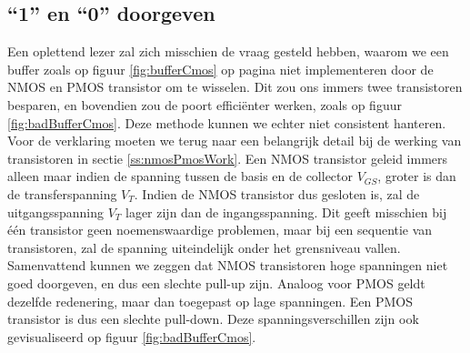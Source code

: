 \subsection{``1'' en ``0'' doorgeven}
Een oplettend lezer zal zich misschien de vraag gesteld hebben, waarom we een buffer zoals op figuur \ref{fig:bufferCmos} op pagina \pageref{fig:bufferCmos} niet implementeren door de NMOS en PMOS transistor om te wisselen. Dit zou ons immers twee transistoren besparen, en bovendien zou de poort effici\"enter werken, zoals op figuur \ref{fig:badBufferCmos}. Deze methode kunnen we echter niet consistent hanteren. Voor de verklaring moeten we terug naar een belangrijk detail bij de werking van transistoren in sectie \ref{ss:nmosPmosWork}. Een NMOS transistor geleid immers alleen maar indien de spanning tussen de basis en de collector $V_{GS}$, groter is dan de transferspanning $V_{T}$. Indien de NMOS transistor dus gesloten is, zal de uitgangsspanning $V_{T}$ lager zijn dan de ingangsspanning. Dit geeft misschien bij \'e\'en transistor geen noemenswaardige problemen, maar bij een sequentie van transistoren, zal de spanning uiteindelijk onder het grensniveau vallen. Samenvattend kunnen we zeggen dat NMOS transistoren hoge spanningen niet goed doorgeven, en dus een slechte pull-up zijn. Analoog voor PMOS geldt dezelfde redenering, maar dan toegepast op lage spanningen. Een PMOS transistor is dus een slechte pull-down. Deze spanningsverschillen zijn ook gevisualiseerd op figuur \ref{fig:badBufferCmos}.
